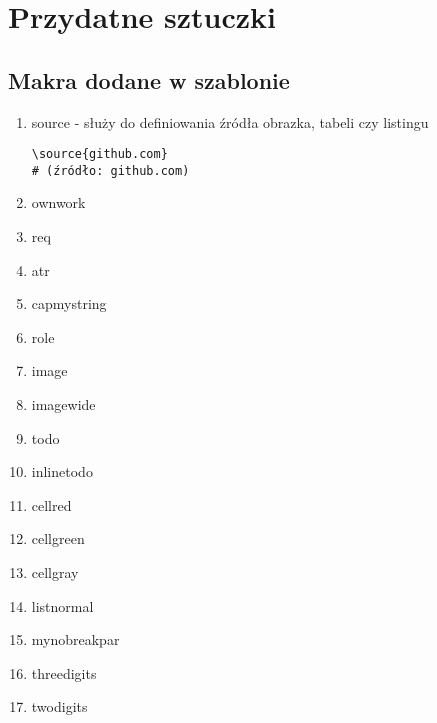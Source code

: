 \chapter{Przydatne sztuczki}
\section{Makra dodane w szablonie}
\begin{enumerate}
\item source - służy do definiowania źródła obrazka, tabeli czy listingu

\begin{verbatim}
\source{github.com}
# (źródło: github.com)
\end{verbatim}

\item ownwork
\item req
\item atr
\item capmystring
\item role
\item image
\item imagewide
\item todo
\item inlinetodo
\item cellred
\item cellgreen
\item cellgray
\item listnormal
\item mynobreakpar
\item threedigits
\item twodigits

\end{enumerate}